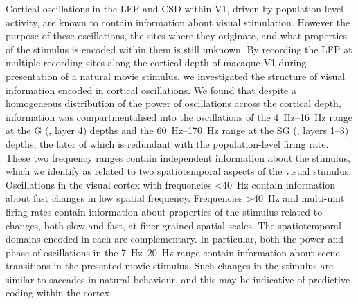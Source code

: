 Cortical oscillations in the \acf{LFP} and \acf{CSD} within \ac{V1}, driven by population-level activity, are known to contain information about visual stimulation.
However the purpose of these oscillations, the sites where they originate, and what properties of the stimulus is encoded within them is still unknown.
By recording the \ac{LFP} at multiple recording sites along the cortical depth of macaque \ac{V1} during presentation of a natural movie stimulus, we investigated the structure of visual information encoded in cortical oscillations.
We found that despite a homogeneous distribution of the power of oscillations across the cortical depth, information was compartmentalised into the oscillations of the \SIrange{4}{16}{Hz} range at the \acl{G} (, layer 4) depths and the \SIrange{60}{170}{Hz} range at the \acl{SG} (, layers 1--3) depths, the later of which is redundant with the population-level firing rate.
These two frequency ranges contain independent information about the stimulus, which we identify as related to two spatiotemporal aspects of the visual stimulus.
Oscillations in the visual cortex with frequencies \SI{<40}{Hz} contain information about fast changes in low spatial frequency.
Frequencies \SI{>40}{Hz} and multi-unit firing rates contain information about properties of the stimulus related to changes, both slow and fast, at finer-grained spatial scales.
The spatiotemporal domains encoded in each are complementary.
In particular, both the power and phase of oscillations in the \SIrange{7}{20}{Hz} range contain information about scene transitions in the presented movie stimulus.
Such changes in the stimulus are similar to saccades in natural behaviour, and this may be indicative of predictive coding within the cortex.


\endgroup			

\vfill
